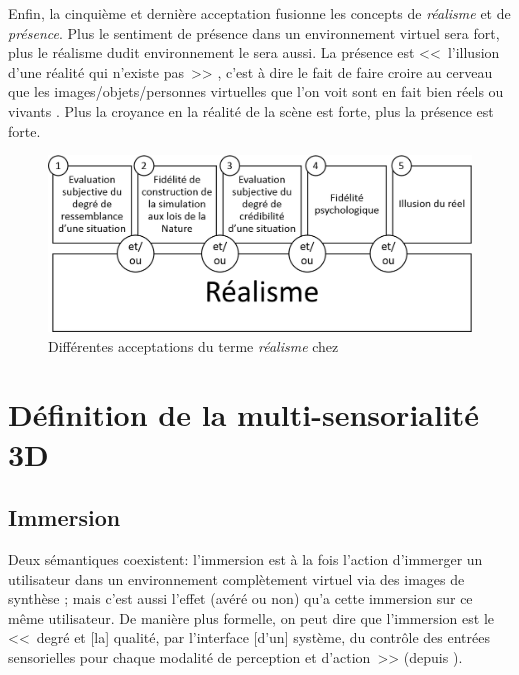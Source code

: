 	\par Enfin, la cinquième et dernière acceptation fusionne les concepts de \textit{réalisme} et de \textit{présence}. Plus le sentiment de présence dans un environnement virtuel sera fort, plus le réalisme dudit environnement le sera aussi. La présence est <<~l'illusion d'une réalité qui n'existe pas~>> \citep{stoffregen_one_2003}, c'est à dire le fait de faire croire au cerveau que les images/objets/personnes virtuelles que l'on voit sont en fait bien réels ou vivants \citep{burkhardt_realite_2003}. Plus la croyance en la réalité de la scène est forte, plus la présence est forte.
	
	\begin{figure}[h]
		\centering
		\includegraphics[scale=.65]{Figures/AcceptationsRealisme}
		\caption{Différentes acceptations du terme \textit{réalisme} chez \cite{fuchs_traite_2003}}
		\label{fig:acceptations_realisme}
	\end{figure}
	
	\section{Définition de la multi-sensorialité 3D}
	\subsection{Immersion}
	\par Deux sémantiques coexistent: l'immersion est à la fois l'action d'immerger un utilisateur dans un environnement complètement virtuel via des images de synthèse ; mais c'est aussi l'effet (avéré ou non) qu'a cette immersion sur ce même utilisateur. De manière plus formelle, on peut dire que l'immersion est le <<~degré et [la] qualité, par l'interface [d'un] système, du contrôle des entrées sensorielles pour chaque modalité de perception et d'action~>> (depuis \citep{fuchs_traite_2003}).
	
